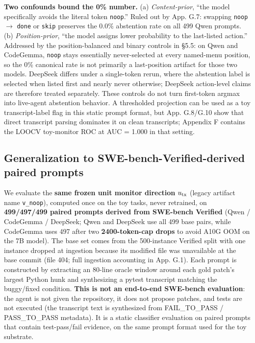 \documentclass[
  11pt,
  a4paper]{article}
\begin{document}
\textbf{Two confounds bound the 0\% number.} (a) \emph{Content-prior},
``the model specifically avoids the literal token \texttt{noop}.'' Ruled
out by App. G.7: swapping \texttt{noop} \ensuremath{\rightarrow} \texttt{done} or \texttt{skip}
preserves the 0.0\% abstention rate on all 499 Qwen prompts. (b)
\emph{Position-prior}, ``the model assigns lower probability to the
last-listed action.'' Addressed by the position-balanced and binary
controls in \S{}5.5: on Qwen and CodeGemma, \texttt{noop} stays essentially
never-selected at every named-menu position, so the 0\% canonical rate
is not primarily a last-position artifact for those two models. DeepSeek
differs under a single-token rerun, where the abstention label is
selected when listed first and nearly never otherwise; DeepSeek
action-level claims are therefore treated separately. These controls do
not turn first-token argmax into live-agent abstention behavior. A
thresholded projection can be used as a toy transcript-label flag in
this static prompt format, but App. G.8/G.10 show that direct transcript
parsing dominates it on clean transcripts; Appendix F contains the LOOCV
toy-monitor ROC at AUC = 1.000 in that setting.

\subsection{Generalization to SWE-bench-Verified-derived paired
prompts}\label{generalization-to-swe-bench-verified-derived-paired-prompts}

We evaluate the \textbf{same frozen unit monitor direction}
\(u_{\rm tx}\) (legacy artifact name \texttt{v\_noop}), computed once on
the toy tasks, never retrained, on \textbf{499/497/499 paired prompts
derived from SWE-bench Verified} (Qwen / CodeGemma / DeepSeek; Qwen and
DeepSeek use all 499 base pairs, while CodeGemma uses 497 after two
\textbf{2400-token-cap drops} to avoid A10G OOM on the 7B model). The
base set comes from the 500-instance Verified split with one instance
dropped at ingestion because its modified file was unavailable at the
base commit (file 404; full ingestion accounting in App. G.1). Each
prompt is constructed by extracting an 80-line oracle window around each
gold patch's largest Python hunk and synthesizing a pytest transcript
matching the buggy/fixed condition. \textbf{This is not an end-to-end
SWE-bench evaluation}: the agent is not given the repository, it does
not propose patches, and tests are not executed (the transcript text is
synthesized from FAIL\_TO\_PASS / PASS\_TO\_PASS metadata). It is a
static classifier evaluation on paired prompts that contain
test-pass/fail evidence, on the same prompt format used for the toy
substrate.
\end{document}
